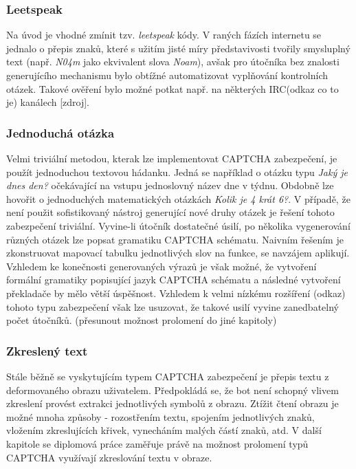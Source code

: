 \documentclass[
  master=true,
  biblatex,
  glossaries,
  index
]{kidiplom}
\begin{document}
\subsubsection*{Leetspeak} 
Na úvod je vhodné zmínit tzv. \textit{leetspeak} kódy. V raných fázích internetu se jednalo o přepis znaků, které s užitím jisté míry představivosti tvořily smysluplný text (např. \textit{N04m} jako ekvivalent slova \textit{Noam}), avšak pro útočníka bez znalosti generujícího mechanismu bylo obtížné automatizovat vyplňování kontrolních otázek. Takové ověření bylo možné potkat např. na některých IRC(odkaz co to je) kanálech [zdroj].
 
\subsubsection*{Jednoduchá otázka}
Velmi triviální metodou, kterak lze implementovat CAPTCHA zabezpečení, je použít jednoduchou textovou hádanku. Jedná se například o otázku typu \textit{Jaký je dnes den?} očekávající na vstupu jednoslovný název dne v týdnu. Obdobně lze hovořit o jednoduchých matematických otázkách \textit{Kolik je 4 krát 6?}. V případě, že není použit sofistikovaný nástroj generující nové druhy otázek je řešení tohoto zabezpečení triviální. Vyvine-li útočník dostatečné úsilí, po několika vygenerování různých otázek lze popsat gramatiku CAPTCHA schématu. Naivním řešením je zkonstruovat mapovací tabulku jednotlivých slov na funkce, se navzájem aplikují. Vzhledem ke konečnosti generovaných výrazů je však možné, že vytvoření formální gramatiky popisující jazyk CAPTCHA schématu a následné vytvoření překladače by mělo větší úspěšnost. Vzhledem k velmi nízkému rozšíření (odkaz) tohoto typu zabezpečení však lze usuzovat, že takové usilí vyvine zanedbatelný počet útočníků. (přesunout možnost prolomení do jiné kapitoly)

\subsubsection*{Zkreslený text}
Stále běžně se vyskytujícím typem CAPTCHA zabezpečení je přepis textu z deformovaného obrazu uživatelem. Předpokládá se, že bot není schopný vlivem zkreslení provést extrakci jednotlivých symbolů z obrazu. Ztížit čtení obrazu je možné mnoha způsoby - rozostřením textu, spojením jednotlivých znaků, vložením zkreslujících křivek, vynecháním malých částí znaků, atd. V další kapitole se diplomová práce zaměřuje právě na možnost prolomení typů CAPTCHA využívají zkreslování textu v obraze.
\end{document}
